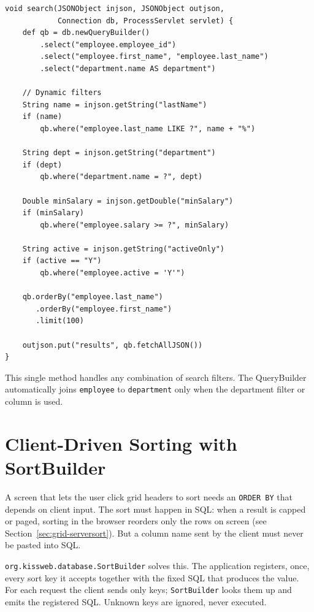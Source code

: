 \begin{lstlisting}[style=groovy]
void search(JSONObject injson, JSONObject outjson,
            Connection db, ProcessServlet servlet) {
    def qb = db.newQueryBuilder()
        .select("employee.employee_id")
        .select("employee.first_name", "employee.last_name")
        .select("department.name AS department")

    // Dynamic filters
    String name = injson.getString("lastName")
    if (name)
        qb.where("employee.last_name LIKE ?", name + "%")

    String dept = injson.getString("department")
    if (dept)
        qb.where("department.name = ?", dept)

    Double minSalary = injson.getDouble("minSalary")
    if (minSalary)
        qb.where("employee.salary >= ?", minSalary)

    String active = injson.getString("activeOnly")
    if (active == "Y")
        qb.where("employee.active = 'Y'")

    qb.orderBy("employee.last_name")
       .orderBy("employee.first_name")
       .limit(100)

    outjson.put("results", qb.fetchAllJSON())
}
\end{lstlisting}

\noindent
This single method handles any combination of search filters.  The QueryBuilder automatically joins \texttt{employee} to \texttt{department} only when the department filter or column is used.

\section{Client-Driven Sorting with SortBuilder}
\label{sec:qb-sortbuilder}

A screen that lets the user click grid headers to sort needs an \texttt{ORDER BY} that depends on client input.  The sort must happen in SQL: when a result is capped or paged, sorting in the browser reorders only the rows on screen (see Section~\ref{sec:grid-serversort}).  But a column name sent by the client must never be pasted into SQL.

\texttt{org.kissweb.database.SortBuilder} solves this.  The application registers, once, every sort key it accepts together with the fixed SQL that produces the value.  For each request the client sends only keys; \texttt{SortBuilder} looks them up and emits the registered SQL.  Unknown keys are ignored, never executed.


